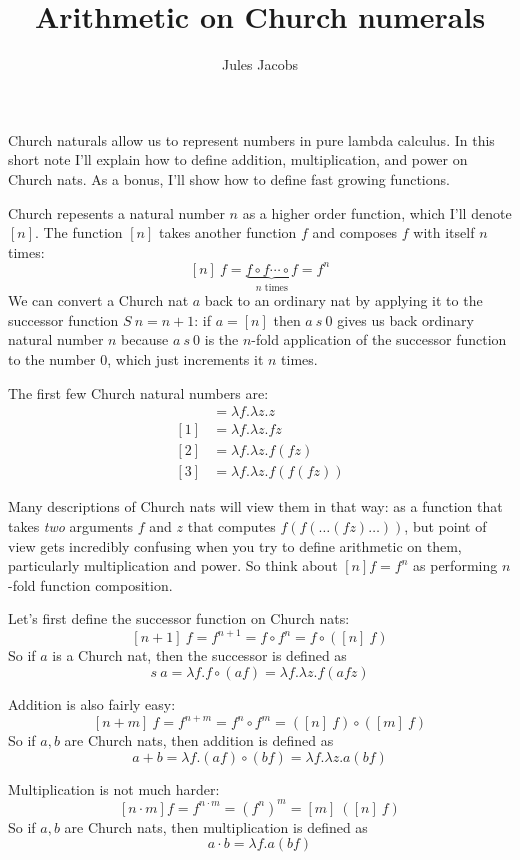\documentclass[a4paper, 11pt]{article}
\title{Arithmetic on Church numerals}
\author{Jules Jacobs}
\theoremstyle{definition}
\begin{document}
\maketitle

Church naturals allow us to represent numbers in pure lambda calculus. In this short note I'll explain how to define addition, multiplication, and power on Church nats. As a bonus, I'll show how to define fast growing functions.

Church repesents a natural number $n$ as a higher order function, which I'll denote $[n]$. The function $[n]$ takes another function $f$ and composes $f$ with itself $n$ times:
\[
  [n]\ f = \underbrace{f \circ f \cdots \circ f}_{n\text{ times}} = f^n
\]
We can convert a Church nat $a$ back to an ordinary nat by applying it to the successor function $S\ n = n+1$: if $a = [n]$ then $a\ s\ 0$ gives us back ordinary natural number $n$ because $a\ s\ 0$ is the $n$-fold application of the successor function to the number $0$, which just increments it $n$ times.

The first few Church natural numbers are:
\begin{align*}
  [0] &= \lambda f.\lambda z. z\\
  [1] &= \lambda f.\lambda z. f z\\
  [2] &= \lambda f.\lambda z.f (f z)\\
  [3] &= \lambda f.\lambda z.f (f (f z))
\end{align*}

Many descriptions of Church nats will view them in that way: as a function that takes \emph{two} arguments $f$ and $z$ that computes $f (f (\dots (f z) \dots))$, but point of view gets incredibly confusing when you try to define arithmetic on them, particularly multiplication and power. So think about $[n] f = f^n$ as performing $n$-fold function composition.

Let's first define the successor function on Church nats:
\[
  [n + 1]\ f = f^{n+1} = f \circ f^n = f \circ ([n]\ f)
\]
So if $a$ is a Church nat, then the successor is defined as
\[
  s\ a = \lambda f. f \circ (a f) = \lambda f. \lambda z. f (a f z)
\]


Addition is also fairly easy:
\[
  [n+m]\ f = f^{n+m} = f^n \circ f^m = ([n]\ f) \circ ([m]\ f)
\]
So if $a,b$ are Church nats, then addition is defined as
\[
  a + b = \lambda f. (a f) \circ (b f) = \lambda f. \lambda z. a (b f)
\]

Multiplication is not much harder:
\[
  [n\cdot m] f = f^{n\cdot m} = (f^n)^m = [m]\ ([n]\ f)
\]
So if $a,b$ are Church nats, then multiplication is defined as
\[
  a \cdot b = \lambda f. a (b f)
\]
\end{document}
